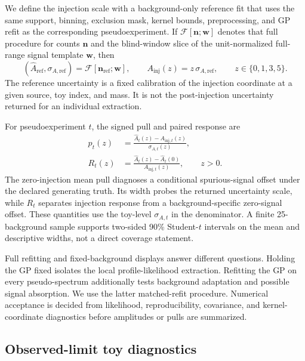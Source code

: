 We define the injection scale with a background-only reference fit that uses the same
support, binning, exclusion mask, kernel bounds, preprocessing, and GP refit as the
corresponding pseudoexperiment. If
$\mathcal{F}[\bm n;\bm w]$ denotes that full procedure for counts $\bm n$ and the
blind-window slice of the unit-normalized full-range signal template $\bm w$, then
\begin{equation}
(\widehat A_{\mathrm{ref}},\sigma_{A,\mathrm{ref}})
=\mathcal{F}[\bm n_{\mathrm{ref}};\bm w],
\qquad
A_{\mathrm{inj}}(z)=z\,\sigma_{A,\mathrm{ref}},
\qquad z\in\{0,1,3,5\}.
\label{eq:v4p9-matched-reference-axis}
\end{equation}
The reference uncertainty is a fixed calibration of the injection coordinate at a
given source, toy index, and mass.  It is not the post-injection uncertainty returned
for an individual extraction.

For pseudoexperiment $t$, the signed pull and paired response are
\begin{align}
p_t(z)&=\frac{\widehat A_t(z)-A_{\mathrm{inj},t}(z)}
                  {\sigma_{A,t}(z)},
\label{eq:v4p9-pull}\\
R_t(z)&=\frac{\widehat A_t(z)-\widehat A_t(0)}
                  {A_{\mathrm{inj},t}(z)},\qquad z>0.
\label{eq:v4p9-paired-response}
\end{align}
The zero-injection mean pull diagnoses a conditional spurious-signal offset under the
declared generating truth.  Its width probes the returned uncertainty scale, while
$R_t$ separates injection response from a background-specific zero-signal offset.
These quantities use the toy-level $\sigma_{A,t}$ in the denominator.  A finite
25-background sample supports two-sided 90\% Student-$t$ intervals on the mean and descriptive
widths, not a direct coverage statement.

Full refitting and fixed-background displays answer different questions. Holding the GP
fixed isolates the local profile-likelihood extraction.  Refitting the GP on every
pseudo-spectrum additionally tests background adaptation and possible signal
absorption. We use the latter matched-refit procedure. Numerical acceptance is decided
from likelihood, reproducibility, covariance, and kernel-coordinate diagnostics before
amplitudes or pulls are summarized.

\subsection{Observed-limit toy diagnostics}


